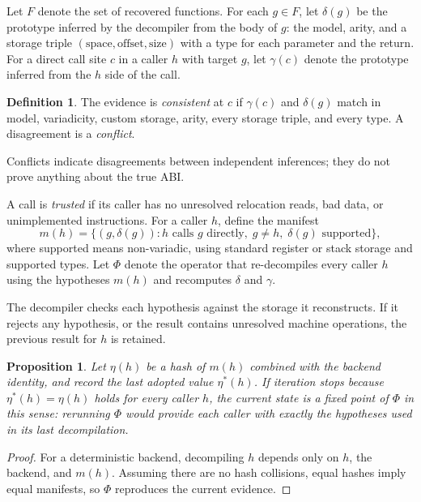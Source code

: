 \documentclass[11pt]{article}
\newtheorem{proposition}[theorem]{Proposition}
\theoremstyle{definition}
\newtheorem{definition}[theorem]{Definition}
\theoremstyle{remark}
\begin{document}
Let $F$ denote the set of recovered functions. For each $g \in F$, let $\delta(g)$ be the prototype inferred by the decompiler from the body of $g$: the model, arity, and a storage triple $(\text{space}, \text{offset}, \text{size})$ with a type for each parameter and the return. For a direct call site $c$ in a caller $h$ with target $g$, let $\gamma(c)$ denote the prototype inferred from the $h$ side of the call.

\begin{definition}
The evidence is \emph{consistent} at $c$ if $\gamma(c)$ and $\delta(g)$ match in model, variadicity, custom storage, arity, every storage triple, and every type. A disagreement is a \emph{conflict}.
\end{definition}

Conflicts indicate disagreements between independent inferences; they do not prove anything about the true ABI.

A call is \emph{trusted} if its caller has no unresolved relocation reads, bad data, or unimplemented instructions. For a caller $h$, define the manifest
\[
  m(h) = \{ (g, \delta(g)) : h \text{ calls } g \text{ directly},\; g \neq h,\; \delta(g) \text{ supported} \},
\]
where supported means non-variadic, using standard register or stack storage and supported types. Let $\Phi$ denote the operator that re-decompiles every caller $h$ using the hypotheses $m(h)$ and recomputes $\delta$ and $\gamma$.

The decompiler checks each hypothesis against the storage it reconstructs. If it rejects any hypothesis, or the result contains unresolved machine operations, the previous result for $h$ is retained.

\begin{proposition}
Let $\eta(h)$ be a hash of $m(h)$ combined with the backend identity, and record the last adopted value $\eta^\ast(h)$. If iteration stops because $\eta^\ast(h) = \eta(h)$ holds for every caller $h$, the current state is a fixed point of $\Phi$ in this sense: rerunning $\Phi$ would provide each caller with exactly the hypotheses used in its last decompilation.
\end{proposition}

\begin{proof}
For a deterministic backend, decompiling $h$ depends only on $h$, the backend, and $m(h)$. Assuming there are no hash collisions, equal hashes imply equal manifests, so $\Phi$ reproduces the current evidence.
\end{proof}
\end{document}
